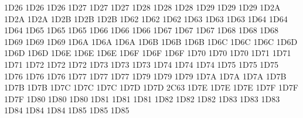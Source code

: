 \setcclcuc 1D26 1D26 1D26 %
\setcclcuc 1D27 1D27 1D27 %
\setcclcuc 1D28 1D28 1D28 %
\setcclcuc 1D29 1D29 1D29 %
\setcclcuc 1D2A 1D2A 1D2A %
\setcclcuc 1D2B 1D2B 1D2B %
\setcclcuc 1D62 1D62 1D62 %
\setcclcuc 1D63 1D63 1D63 %
\setcclcuc 1D64 1D64 1D64 %
\setcclcuc 1D65 1D65 1D65 %
\setcclcuc 1D66 1D66 1D66 %
\setcclcuc 1D67 1D67 1D67 %
\setcclcuc 1D68 1D68 1D68 %
\setcclcuc 1D69 1D69 1D69 %
\setcclcuc 1D6A 1D6A 1D6A %
\setcclcuc 1D6B 1D6B 1D6B %
\setcclcuc 1D6C 1D6C 1D6C %
\setcclcuc 1D6D 1D6D 1D6D %
\setcclcuc 1D6E 1D6E 1D6E %
\setcclcuc 1D6F 1D6F 1D6F %
\setcclcuc 1D70 1D70 1D70 %
\setcclcuc 1D71 1D71 1D71 %
\setcclcuc 1D72 1D72 1D72 %
\setcclcuc 1D73 1D73 1D73 %
\setcclcuc 1D74 1D74 1D74 %
\setcclcuc 1D75 1D75 1D75 %
\setcclcuc 1D76 1D76 1D76 %
\setcclcuc 1D77 1D77 1D77 %
\setcclcuc 1D79 1D79 1D79 %
\setcclcuc 1D7A 1D7A 1D7A %
\setcclcuc 1D7B 1D7B 1D7B %
\setcclcuc 1D7C 1D7C 1D7C %
\setcclcuc 1D7D 1D7D 2C63 %
\setcclcuc 1D7E 1D7E 1D7E %
\setcclcuc 1D7F 1D7F 1D7F %
\setcclcuc 1D80 1D80 1D80 %
\setcclcuc 1D81 1D81 1D81 %
\setcclcuc 1D82 1D82 1D82 %
\setcclcuc 1D83 1D83 1D83 %
\setcclcuc 1D84 1D84 1D84 %
\setcclcuc 1D85 1D85 1D85 %
